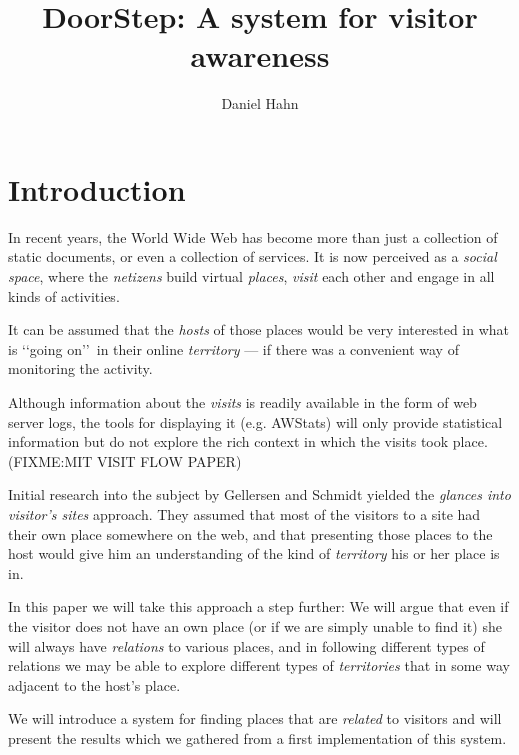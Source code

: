 \documentclass[a4paper]{danarticle}
\begin{document}
  \author{Daniel Hahn}
  \title{DoorStep: A system for visitor awareness}
  \maketitle
  
  \section{Introduction}
    In recent years, the World Wide Web has become more than just a collection
    of static documents, or even a collection of services. It is now perceived
    as a \textit{social space}, where the \textit{netizens} build virtual
    \textit{places}, \textit{visit} each other and engage in all kinds of
    activities.
    
    It can be assumed that the \textit{hosts} of those places would be
    very interested in what is \lq\lq going on\rq\rq\ in their online
    \textit{territory} --- if
    there was a convenient way of monitoring the activity. 
    
    Although
    information about the \textit{visits} is readily available in the
    form of web server logs, the tools for displaying it (e.g. AWStats) will only
    provide statistical information but do not explore the rich context in which
    the visits took place. (FIXME:MIT VISIT FLOW PAPER)
    
    Initial research into the subject by Gellersen and Schmidt\cite{webaware}
    yielded the
    \textit{glances into visitor's sites} approach. They assumed that most of
    the visitors to a site had their own place somewhere on the web, and that
    presenting those places to the host would give him an understanding of the
    kind of \textit{territory} his or her place is in.
    
    In this paper we will take this approach a step further: We will argue that
    even if the visitor does not have an own place (or if we are
    simply unable to find it) she will always have \textit{relations} to various
    places, and in following different types of relations we may be able to
    explore different types of \textit{territories} that in some way adjacent to
    the host's place.
    
    We will introduce a system for finding places that are \textit{related} to
    visitors and will present the results which we gathered from a first
    implementation of this system.
\end{document}
